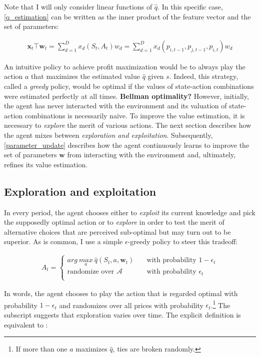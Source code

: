 Note that I will only consider linear functions of $\hat{q}$. In this specific case, \autoref{q_estimation} can be written as the inner product of the feature vector and the set of parameters:

\begin{gather}\label{q_estimation_linear}
\boldsymbol{x}_t \top \boldsymbol{w}_t = \sum_{d=1}^{D} x_d(S_t, A_t) w_d = \sum_{d=1}^{D} x_d(p_{i, t-1}, p_{j, t-1}, p_{i, t}) w_d
\end{gather}

An intuitive policy to achieve profit maximization would be to always play the action $a$ that maximizes the estimated value $\hat{q}$ given $s$. Indeed, this strategy, called a \emph{greedy} policy, would be optimal if the values of state-action combinations were estimated perfectly at all times. \textbf{Bellman optimality?} However, initially, the agent has never interacted with the environment and its valuation of state-action combinations is necessarily naive. To improve the value estimation, it is necessary to \emph{explore} the merit of various actions. The next section describes how the agent mixes between \emph{exploration and exploitation}. Subsequently, \autoref{parameter_update} describes how the agent continuously learns to improve the set of parameters $\boldsymbol{w}$ from interacting with the environment and, ultimately, refines its value estimation.

\subsection{Exploration and exploitation} 
In every period, the agent chooses either to \emph{exploit} its current knowledge and pick the supposedly optimal action or to \emph{explore} in order to test the merit of alternative choices that are perceived sub-optimal but may turn out to be superior. As is common, I use a simple $\epsilon$-greedy policy to steer this tradeoff:

\begin{gather}\label{action_selection}
 A_t = \begin{cases} arg ~\underset{a}{max} ~ \hat{q}(S_t,a,\boldsymbol{w}_t) & \quad \text{with probability } 1 - \epsilon_t\\
\text{randomize over } \mathcal{A} & \quad \text{with probability } \epsilon_t\\ \end{cases} 
\end{gather}

In words, the agent chooses to play the action that is regarded optimal with probability $1-\epsilon_t$ and randomizes over all prices with probability $\epsilon_t$.\footnote{If more than one $a$ maximizes $\hat{q}$, ties are broken randomly.} The subscript suggests that exploration varies over time. The explicit definition is equivalent to \textcite{calvano_artificial_2020}:

